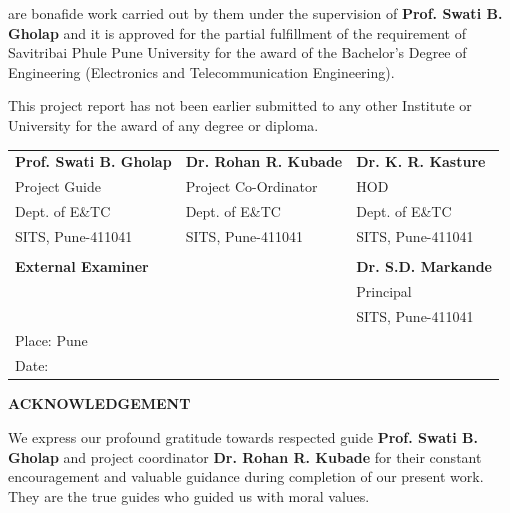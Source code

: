 \documentclass[12pt,a4paper]{report}
\numberwithin{figure}{subsection}
\numberwithin{table}{subsection}
\begin{document}
{\fontsize{12}{14}\selectfont 
are bonafide work carried out by them under the supervision of \textbf{Prof. Swati B. Gholap} and it is approved for the partial fulfillment of the requirement of Savitribai Phule Pune University for the award of the Bachelor's Degree of Engineering (Electronics and Telecommunication Engineering).

\vspace{0.5\baselineskip}
This project report has not been earlier submitted to any other Institute or University for the award of any degree or diploma.
}
\vspace{2\baselineskip}

\noindent
\begin{tabular}{@{}p{}p{}p{}@{}}
\centering \textbf{Prof. Swati B. Gholap} & \centering \textbf{Dr. Rohan R. Kubade} & \centering\arraybackslash \textbf{Dr. K. R. Kasture} \\
\centering Project Guide & \centering Project Co-Ordinator & \centering\arraybackslash HOD \\
\centering Dept. of E\&TC & \centering Dept. of E\&TC & \centering\arraybackslash Dept. of E\&TC \\
\centering SITS, Pune-411041 & \centering SITS, Pune-411041 & \centering\arraybackslash SITS, Pune-411041 \\
\rule{0pt}{3cm} & & \\
\centering \textbf{External Examiner} & & \centering\arraybackslash \textbf{Dr. S.D. Markande} \\
 & & \centering\arraybackslash Principal \\
 & & \centering\arraybackslash SITS, Pune-411041 \\[2\baselineskip]

Place: Pune & & \\
Date: & & \\
\end{tabular}

\newpage
\begin{center}
{\fontsize{14}{16}\selectfont \textbf{ACKNOWLEDGEMENT}} \\[1.5\baselineskip]
\end{center}

\fontsize{12}{14}\selectfont
We express our profound gratitude towards respected guide \textbf{Prof. Swati B. Gholap} and project coordinator \textbf{Dr. Rohan R. Kubade} for their constant encouragement and valuable guidance during completion of our present work. They are the true guides who guided us with moral values.
\end{document}
